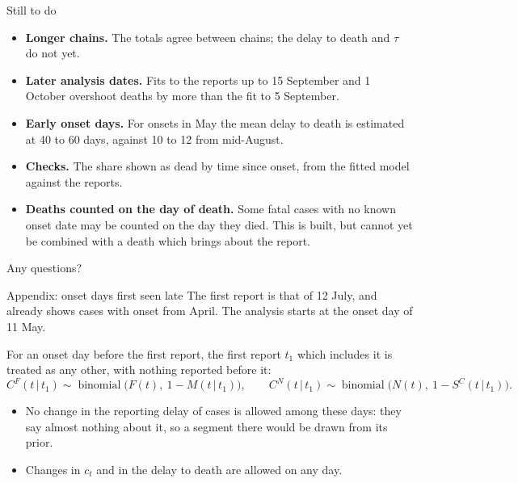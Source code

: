 \documentclass[aspectratio=169,9pt]{beamer}
\newcommand{\given}{\,|\,}
\newcommand{\bin}{\operatorname{binomial}}
\begin{document}
\begin{frame}{Still to do}
\begin{itemize}
\item \textbf{Longer chains.} The totals agree between chains; the delay to
death and $\tau$ do not yet.
\item \textbf{Later analysis dates.} Fits to the reports up to 15 September
and 1 October overshoot deaths by more than the fit to 5 September.
\item \textbf{Early onset days.} For onsets in May the mean delay to death
is estimated at 40 to 60 days, against 10 to 12 from mid-August.
\item \textbf{Checks.} The share shown as dead by time since onset, from the
fitted model against the reports.
\item \textbf{Deaths counted on the day of death.} Some fatal cases with no
known onset date may be counted on the day they died. This is built, but
cannot yet be combined with a death which brings about the report.
\end{itemize}
\end{frame}

\begin{frame}
\centering
\Huge Any questions?
\end{frame}

\appendix

\begin{frame}{Appendix: onset days first seen late}
The first report is that of 12 July, and already shows cases with onset from
April. The analysis starts at the onset day of 11 May.

\bigskip
For an onset day before the first report, the first report $t_1$ which
includes it is treated as any other, with nothing reported before it:
\[
C^{F}(t\given t_1)\sim\bin\bigl(F(t),\ 1-M(t\given t_1)\bigr),\qquad
C^{N}(t\given t_1)\sim\bin\bigl(N(t),\ 1-S^{C}(t\given t_1)\bigr).
\]

\begin{itemize}
\item No change in the reporting delay of cases is allowed among these
days: they say almost nothing about it, so a segment there would be drawn
from its prior.
\item Changes in $c_t$ and in the delay to death are allowed on any day.
\end{itemize}
\end{frame}
\end{document}
